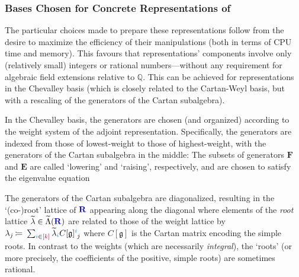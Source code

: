 \documentclass[12pt,a4paper]{article}\let\ifpdf\relax
\begin{document}
%

\subsubsection{\texorpdfstring{Bases Chosen for Concrete Representations of \rpackage}{Bases Chosen for Concrete Representations of the Package}}\label{basis_choices_for_concrete_reps}\vspace{-4pt}

The particular choices made to prepare these representations follow from the desire to maximize the efficiency of their manipulations (both in terms of CPU time and memory). This favours that representations' components involve only (relatively small) integers or rational numbers---without any requirement for algebraic field extensions relative to $\mathbb{Q}$. This can be achieved for representations in the Chevalley basis \cite{chevalley1946theory} (which is closely related to the Cartan-Weyl basis, but with a rescaling of the generators of the Cartan subalgebra). 

In the Chevalley basis, the generators are chosen (and organized) according to the weight system of the adjoint representation. Specifically, the generators are indexed from those of lowest-weight to those of highest-weight, with the generators of the Cartan subalgebra in the middle:
%
\vspace{-4pt}
%
The subsets of generators $\mathbf{F}$ and $\mathbf{E}$ are called `lowering' and `raising', respectively, and are chosen to satisfy the eigenvalue equation
%
\vspace{-5pt}
%

The generators of the Cartan subalgebra are diagonalized, resulting in the `\mbox{(co-)}root' lattice of $\mathbf{\b{R}}$ appearing along the diagonal
%
%
where elements of the \emph{root} lattice $\tilde{\lambda}\in\tilde{\Lambda}(\mathbf{\b{R}})$ are related to those of the weight lattice by $\lambda_j\equivR\sum_{\t{i}\in\r{[k]}}\tilde{\lambda}_{\t{i}}C[\mathfrak{g}]\indices{\t{i}}{j}$ where $C[\mathfrak{g}]$ is the Cartan matrix encoding the simple roots. In contrast to the weights (which are necessarily \emph{integral}), the `roots' (or more precisely, the coefficients of the positive, simple roots) are sometimes rational. 
\end{document}
